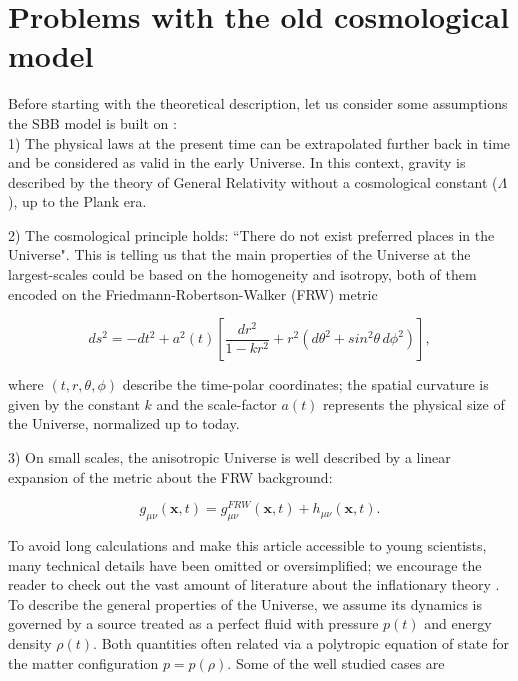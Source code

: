 \documentclass{rmaa}
\def\beq{\begin{equation}}
\def\eeq{\end{equation}}
\begin{document}
\section{Problems with the old
cosmological model}

Before starting with the theoretical description, let us consider some assumptions the
SBB model is built on \citep{Coles}:
\\ 

1) The physical laws at the present time can be extrapolated further back in time and be
 considered as valid in the early Universe. In this context, gravity is described by
 the theory of General Relativity without a cosmological constant ($\Lambda$), up to the Plank era.  

 2) The cosmological principle holds: ``There do not exist preferred places in the Universe".
 This is telling us that the main properties of the Universe at the largest-scales could be based on the homogeneity and isotropy,
both of them encoded on the Friedmann-Robertson-Walker (FRW) metric

\begin{equation}
 ds^2= -dt^2 + a^2(t)\left[ \frac{dr^2}{1-kr^2} +r^2 (d\theta^2 +sin^2\theta\, d\phi^2) \right],
\end{equation}

\noindent
where $(t,r,\theta,\phi)$ describe the time-polar coordinates; the spatial curvature is given by the 
constant $k$ and the scale-factor $a(t)$ represents the physical size of the Universe, normalized up to
today.
  
 3) On small scales, the anisotropic Universe is well described by a linear expansion of the metric about the 
 FRW background:
 
\beq \label{eq:metric}
g_{\mu \nu}(\textbf{x},t)= g_{\mu \nu}^{FRW}(\textbf{x},t)+h_{\mu \nu}(\textbf{x},t).
\eeq

To avoid long calculations and make this article accessible to young scientists, many 
technical details have been omitted or oversimplified; 
we encourage the reader to check out the vast amount of literature about the inflationary theory
 \citep{Lindeb, Kolbbo,  Liddle, LiddleLyth, Dodelson}.
\\

To describe the general properties of the Universe, we assume its dynamics is governed by a source treated as a
perfect fluid with pressure $p(t)$ and energy density $\rho(t)$. Both quantities often related
via a polytropic equation of state for the matter configuration $p=p(\rho)$. Some of the well studied cases are  
\end{document}
